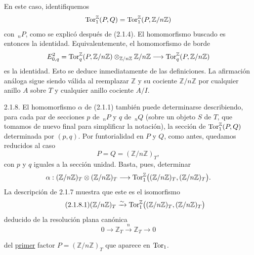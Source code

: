 En este caso, identifiquemos
\[
 \operatorname{Tor}^{\mathbb Z}_1(P,Q)
 =
 \operatorname{Tor}^{\mathbb Z}_1(P,\mathbb Z/n\mathbb Z)
\]
con $\,{}_nP$, como se explicó después de (2.1.4). El homomorfismo
buscado es entonces la identidad. Equivalentemente, el homomorfismo
de borde
\[
 E^2_{0,q}
 =
 \operatorname{Tor}^{\mathbb Z}_q(P,\mathbb Z/n\mathbb Z)
 \otimes_{\mathbb Z/n\mathbb Z}\mathbb Z/n\mathbb Z
 \longrightarrow
 \operatorname{Tor}^{\mathbb Z}_q(P,\mathbb Z/n\mathbb Z)
\]
es la identidad. Esto se deduce inmediatamente de las definiciones.
La afirmación análoga sigue siendo válida al reemplazar $\mathbb Z$ y
su cociente $\mathbb Z/n\mathbb Z$ por cualquier anillo $A$ sobre
$T$ y cualquier anillo cociente $A/I$.

2.1.8. El homomorfismo $\alpha$ de (2.1.1) también puede determinarse
describiendo, para cada par de secciones $p$ de $\,{}_nP$ y $q$ de
$\,{}_nQ$ (sobre un objeto $S$ de $T$, que tomamos de nuevo final para
simplificar la notación), la sección de $\operatorname{Tor}^{\mathbb Z}_1(P,Q)$
determinada por $(p,q)$. Por funtorialidad en $P$ y $Q$, como antes,
quedamos reducidos al caso
\[
 P=Q=(\mathbb Z/n\mathbb Z)_T,
\]
con $p$ y $q$ iguales a la sección unidad. Basta, pues, determinar
\[
 \alpha:
 (\mathbb Z/n\mathbb Z)_T\otimes(\mathbb Z/n\mathbb Z)_T
 \longrightarrow
 \sisi{\uTor^{\mathbb Z}_1
 (\mathbb Z/n\mathbb Z)_T,(\mathbb Z/n\mathbb Z)_T)}%
 {\uTor^{\mathbb Z}_1
 \bigl((\mathbb Z/n\mathbb Z)_T,(\mathbb Z/n\mathbb Z)_T\bigr)}.
\]
La descripción de 2.1.7 muestra que este es el isomorfismo
\begin{equation}\tag{2.1.8.1}
 (\mathbb Z/n\mathbb Z)_T
 \xrightarrow{\sim}
 \sisi{\uTor^{\mathbb Z}_1
 (\mathbb Z/n\mathbb Z)_T,(\mathbb Z/n\mathbb Z)_T)}%
 {\uTor^{\mathbb Z}_1
 \bigl((\mathbb Z/n\mathbb Z)_T,(\mathbb Z/n\mathbb Z)_T\bigr)}
\end{equation}
deducido de la resolución plana canónica
\begin{equation}\tag{2.1.8.2}
 0\longrightarrow\mathbb Z_T
 \xrightarrow{n}\mathbb Z_T
 \longrightarrow0
\end{equation}


del \underline{primer} factor
$P=(\mathbb Z/n\mathbb Z)_T$ que aparece en $\operatorname{Tor}_1$.
